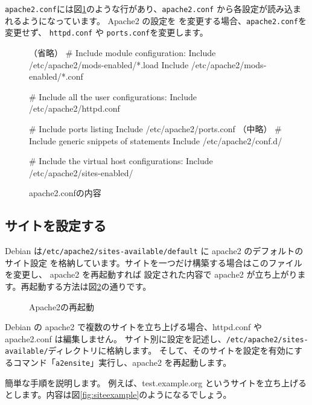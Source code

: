 \documentclass[mingoth,a4paper]{jsarticle}
\begin{document}
\texttt{apache2.conf}には図\ref{fig:apache2conf}のような行があり、\texttt{apache2.conf}
から各設定が読み込まれるようになっています。
Apache2 の設定を
を変更する場合、\texttt{apache2.conf}を変更せず、
\texttt{httpd.conf} や \texttt{ports.conf}を変更します。

\begin{figure}[ht]
\begin{commandline}
（省略）
# Include module configuration:
Include /etc/apache2/mods-enabled/*.load
Include /etc/apache2/mods-enabled/*.conf

# Include all the user configurations:
Include /etc/apache2/httpd.conf

# Include ports listing
Include /etc/apache2/ports.conf
（中略）
# Include generic snippets of statements
Include /etc/apache2/conf.d/

# Include the virtual host configurations:
Include /etc/apache2/sites-enabled/
\end{commandline}

\label{fig:apache2conf}\caption{apache2.confの内容}
\end{figure}


\subsection{サイトを設定する}

Debian は\texttt{/etc/apache2/sites-available/default} に apache2 のデフォルトのサイト設定
を格納しています。サイトを一つだけ構築する場合はこのファイルを変更し、
apache2 を再起動すれば
設定された内容で apache2 が立ち上がります。再起動する方法は図\ref{fig:apache2restart}の通りです。

\begin{figure}[ht]
\label{fig:apache2restart}\caption{Apache2の再起動}
\end{figure}

Debian の apache2 で複数のサイトを立ち上げる場合、httpd.conf や apache2.conf は編集しません。
サイト別に設定を記述し、\texttt{/etc/apache2/sites-available/}ディレクトリに格納します。
そして、そのサイトを設定を有効にするコマンド「\texttt{a2ensite}」実行し、apache2 を再起動します。

簡単な手順を説明します。
例えば、test.example.org というサイトを立ち上げるとします。内容は図\ref{fig:siteexample}のようになるでしょう。
\end{document}
